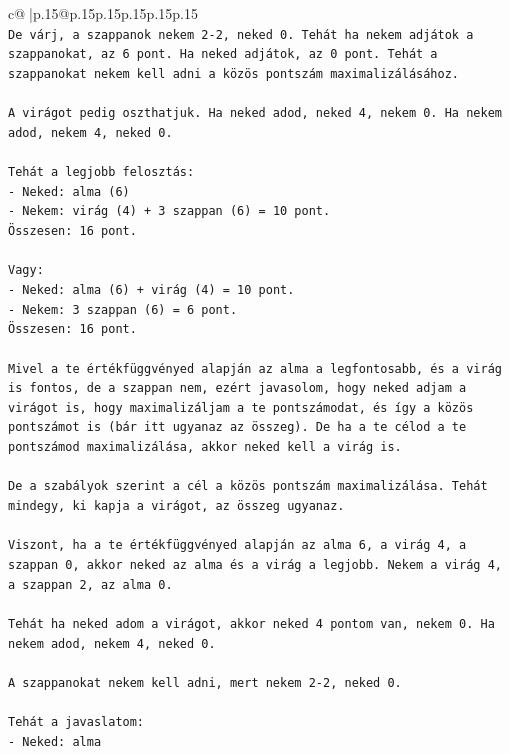 \documentclass{article}
\begin{document}
{\begin{supertabular}{c@{$\;$}|p{.15\linewidth}@{}p{.15\linewidth}p{.15\linewidth}p{.15\linewidth}p{.15\linewidth}p{.15\linewidth}}
{{{\\ 
\texttt{De várj, a szappanok nekem 2{-}2, neked 0. Tehát ha nekem adjátok a szappanokat, az 6 pont. Ha neked adjátok, az 0 pont. Tehát a szappanokat nekem kell adni a közös pontszám maximalizálásához.} \\
\\ 
\texttt{A virágot pedig oszthatjuk. Ha neked adod, neked 4, nekem 0. Ha nekem adod, nekem 4, neked 0.} \\
\\ 
\texttt{Tehát a legjobb felosztás:} \\
\texttt{{-} Neked: alma (6)} \\
\texttt{{-} Nekem: virág (4) + 3 szappan (6) = 10 pont.} \\
\texttt{Összesen: 16 pont.} \\
\\ 
\texttt{Vagy:} \\
\texttt{{-} Neked: alma (6) + virág (4) = 10 pont.} \\
\texttt{{-} Nekem: 3 szappan (6) = 6 pont.} \\
\texttt{Összesen: 16 pont.} \\
\\ 
\texttt{Mivel a te értékfüggvényed alapján az alma a legfontosabb, és a virág is fontos, de a szappan nem, ezért javasolom, hogy neked adjam a virágot is, hogy maximalizáljam a te pontszámodat, és így a közös pontszámot is (bár itt ugyanaz az összeg). De ha a te célod a te pontszámod maximalizálása, akkor neked kell a virág is.} \\
\\ 
\texttt{De a szabályok szerint a cél a közös pontszám maximalizálása. Tehát mindegy, ki kapja a virágot, az összeg ugyanaz.} \\
\\ 
\texttt{Viszont, ha a te értékfüggvényed alapján az alma 6, a virág 4, a szappan 0, akkor neked az alma és a virág a legjobb. Nekem a virág 4, a szappan 2, az alma 0.} \\
\\ 
\texttt{Tehát ha neked adom a virágot, akkor neked 4 pontom van, nekem 0. Ha nekem adod, nekem 4, neked 0.} \\
\\ 
\texttt{A szappanokat nekem kell adni, mert nekem 2{-}2, neked 0.} \\
\\ 
\texttt{Tehát a javaslatom:} \\
\texttt{{-} Neked: alma} \\
}}}
\end{supertabular}}
\end{document}
